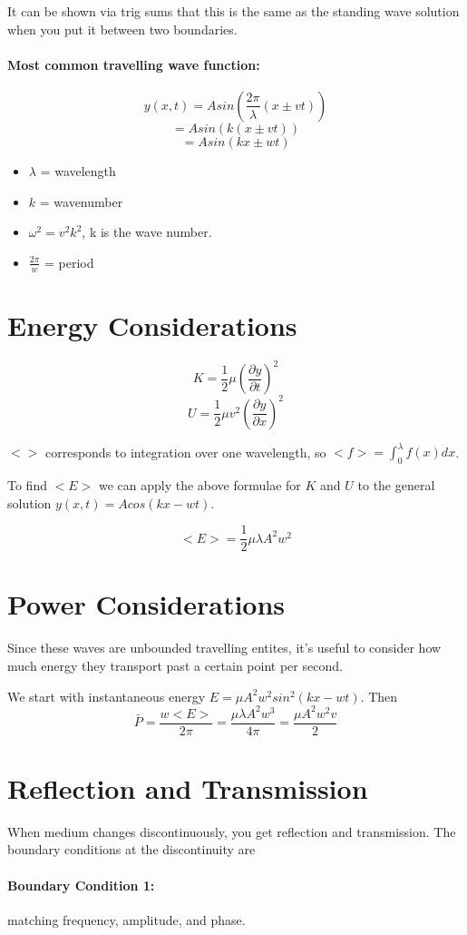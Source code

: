 \documentclass[a4paper,12pt]{report}
\begin{document}
It can be shown via trig sums that this is the same as the standing wave solution when you 
put it between two boundaries.

\paragraph{Most common travelling wave function: } $$y(x, t) = A sin(\frac{2 \pi}{\lambda} (x \pm vt))$$
$$= A sin(k(x\pm vt))$$
$$= A sin(kx \pm wt)$$
\begin{itemize}
\item $\lambda$ = wavelength
\item $k$ = wavenumber
\item $\omega^2 = v^2k^2$, k is the wave number.
\item $\frac{2\pi}{w}$ = period
\end{itemize}

\section{Energy Considerations}
$$K = \frac{1}{2} \mu (\frac{\partial y}{\partial t})^2$$
$$U = \frac{1}{2} \mu v^2 (\frac{\partial y}{\partial x})^2$$

$<>$ corresponds to integration over one wavelength, so $<f> = \int_0^{\lambda} f(x) dx$.

To find $<E>$ we can apply the above formulae for $K$ and $U$ to the general solution 
$y(x, t)=A cos(kx-wt)$.

$$<E> = \frac{1}{2} \mu \lambda A^2 w^2$$

\section{Power Considerations}
Since these waves are unbounded travelling entites, it's useful to consider how much 
energy they transport past a certain point per second.

We start with instantaneous energy $E = \mu A^2 w^2 sin^2(kx - wt)$. Then 
$$\bar{P} = \frac{w <E>}{2 \pi} = \frac{\mu \lambda A^2 w^3}{4 \pi} = \frac{\mu A^2 w^2 v}{2}$$

\section{Reflection and Transmission}
When medium changes discontinuously, you get reflection and transmission. The boundary conditions 
at the discontinuity are 
\paragraph{Boundary Condition 1: } matching frequency, amplitude, and phase.
\end{document}
